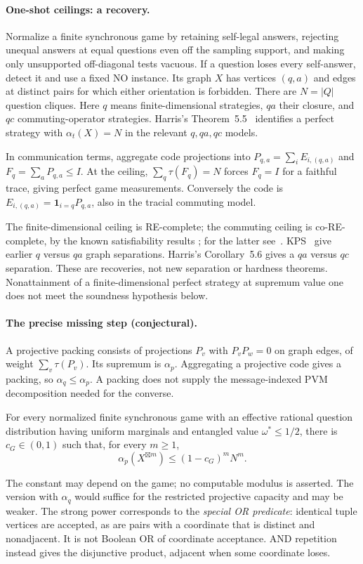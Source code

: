 \paragraph{One-shot ceilings: a recovery.}
Normalize a finite synchronous game by retaining self-legal answers,
rejecting unequal answers at equal questions even off the sampling
support, and making only unsupported off-diagonal tests vacuous.
If a question loses every self-answer, detect it and use a fixed NO
instance. Its graph $X$ has vertices $(q,a)$ and edges at distinct pairs
for which either orientation is forbidden. There are $N=|Q|$ question
cliques. Here $q$ means finite-dimensional strategies, $qa$ their
closure, and $qc$ commuting-operator strategies. Harris's
Theorem~5.5~\cite{Harris} identifies a perfect strategy
with $\alpha_t(X)=N$ in the relevant $q,qa,qc$ models.

In communication terms, aggregate code projections into
$P_{q,a}=\sum_iE_{i,(q,a)}$ and $F_q=\sum_aP_{q,a}\leq I$.
At the ceiling, $\sum_q\tau(F_q)=N$ forces $F_q=I$ for a faithful
trace, giving perfect game measurements. Conversely the code is
$E_{i,(q,a)}=\mathbf1_{i=q}P_{q,a}$, also in the tracial commuting model.

The finite-dimensional ceiling is RE-complete; the commuting ceiling
is co-RE-complete, by the known satisfiability results
\cite{JNVWY,PS}; for the latter see~\cite[Theorem~5.11(c)]{PS}.
KPS~\cite[Theorem~5.4 and Corollary~5.5]{KPS}
give earlier $q$ versus $qa$ graph separations. Harris's
Corollary~5.6 gives a $qa$ versus $qc$ separation. These are recoveries,
not new separation or hardness theorems. Nonattainment of a finite-dimensional
perfect strategy at supremum value one does not meet the soundness
hypothesis below.

\paragraph{The precise missing step (conjectural).}
A projective packing consists of projections $P_v$ with $P_vP_w=0$
on graph edges, of weight $\sum_v\tau(P_v)$. Its supremum is
$\alpha_p$. Aggregating a projective code gives a packing, so
$\alpha_q\leq\alpha_p$. A packing does not supply the message-indexed
PVM decomposition needed for the converse.

\begin{conjecture}\label{conj:orc}
For every normalized finite synchronous game with an effective rational
question distribution having uniform marginals and entangled value
$\omega^*\leq1/2$, there is $c_G\in(0,1)$ such that, for every $m\geq1$,
\[
 \alpha_p(X^{\boxtimes m})\leq(1-c_G)^m N^m.
\]
\end{conjecture}
The constant may depend on the game; no computable modulus is asserted.
The version with $\alpha_q$ would suffice for the restricted projective
capacity and may be weaker. The strong power corresponds to the
\emph{special OR predicate}: identical tuple vertices are accepted, as
are pairs with a coordinate that is distinct and nonadjacent. It is not
Boolean OR of coordinate acceptance. AND repetition instead gives the
disjunctive product, adjacent when some coordinate loses.

